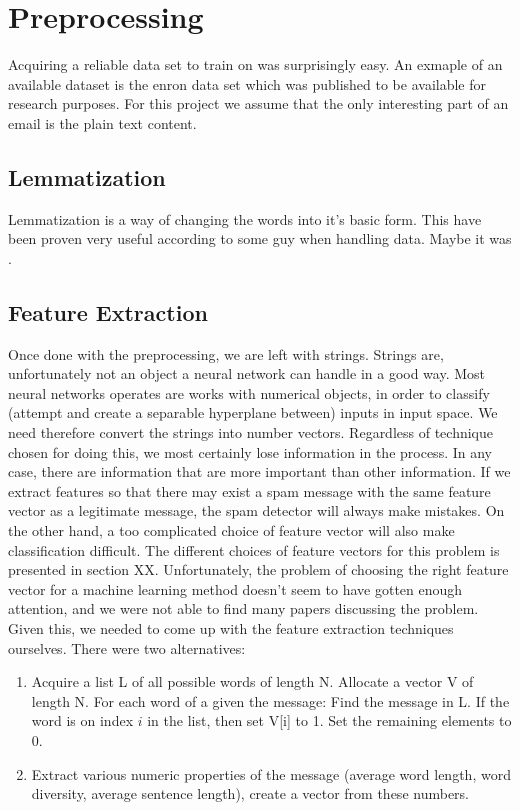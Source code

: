 
\section{Preprocessing}
Acquiring a reliable data set to train on was surprisingly easy. An exmaple of
an available dataset is the enron data set \cite{enron} which was published to
be available for research purposes. For this project we assume that the only
interesting part of an email is the plain text content.

\subsection{Lemmatization} Lemmatization is a way of changing the words into
it's basic form. This have been proven very useful according to some guy when
handling data. Maybe it was
\cite{tretyakov2004machine}.

\subsection{Feature Extraction}

Once done with the preprocessing, we are left with strings. Strings are,
unfortunately not an object a neural network can handle in a good way. 
Most neural networks operates are works with numerical objects, in order to
classify (attempt and create a separable hyperplane between)
inputs in input space. We need therefore convert the strings into number
vectors. Regardless of technique chosen for doing this, we most certainly lose
information in the process. In any case, there are information that are more
important than other information. If we extract features so that there may
exist a spam message with the same feature vector as a legitimate message, the
spam detector will always make mistakes. On the other hand, a too complicated
choice of feature vector will also make classification difficult. The different
choices of feature vectors for this problem is presented in section XX.
Unfortunately, the problem of choosing the right feature vector for a machine
learning method doesn't seem to have gotten enough attention, and we were not
able to find many papers discussing the problem. 
Given this, we needed to come up with the feature extraction techniques
ourselves. There were two alternatives:
\begin{enumerate}
  \item Acquire a list L of all possible words of length N. Allocate a vector V
    of length N. For each word of a given  the message: Find the message in L.
    If the word is on index $i$ in the list, then set V[i] to 1. Set the
    remaining elements to 0.
  \item Extract various numeric properties of the message (average word length,
    word diversity, average sentence length), create a vector from these
    numbers.
\end{enumerate}

